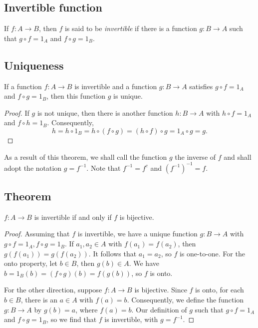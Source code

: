 \documentclass[11pt]{article}
\begin{document}
    \subsection{Invertible function}

    If \(f:A \rightarrow B\), then $f$ is said to be \emph{invertible} if there is a function \(g: B \rightarrow A\) such that \(g \circ f = 1_A\) and \(f \circ g = 1_B.\)

    \subsection{Uniqueness}

    If a function \(f: A \rightarrow B\) is invertible and a function \(g:B \rightarrow A\) satisfies \(g \circ f = 1_A\) and \(f \circ g = 1_B\), then this function $g$ is unique.

    \begin{proof}
        If $g$ is not unique, then there is another function \(h: B \rightarrow A\) with \(h \circ f = 1_A\) and \(f \circ h = 1_B \). Consequently, \[h = h \circ 1_B = h \circ (f \circ g) = (h \circ f) \circ g = 1_A \circ g = g.\]
    \end{proof}

    As a result of this theorem, we shall call the function $g$ the inverse of $f$ and shall adopt the notation \(g = f^{-1}\). Note that \(f^{-1} = f^c\) and \((f^{-1})^{-1} = f.\)

    \subsection{Theorem}

    \(f: A \rightarrow B\) is invertible if and only if $f$ is bijective. 
    \begin{proof}
        Assuming that $f$ is invertible, we have a unique function \(g:B \rightarrow A\) with \(g \circ f = 1_A, f \circ g = 1_B\). If \(a_1,a_2 \in A\) with \(f(a_1) = f(a_2)\), then \(g(f(a_1)) = g(f(a_2))\). It follows that \(a_1 = a_2\), so $f$ is one-to-one. For the onto property, let \(b \in B\), then \(g(b) \in A\). We have \(b = 1_B (b) = (f \circ g)(b) = f(g(b))\), so $f$ is onto.

        \vspace{1em}

        For the other direction, suppose \(f: A \rightarrow B\) is bijective. Since $f$ is onto, for each \(b \in B\), there is an  \(a \in A\) with \(f(a) = b.\) Consequently, we define the function \(g: B \rightarrow A\) by \(g(b) = a\), where \(f(a) = b\). Our definition of $g$ such that \(g \circ f = 1_A\) and \(f \circ g = 1_B\), so we find that $f$ is invertible, with \(g = f^{-1}\).
    \end{proof}
\end{document}
